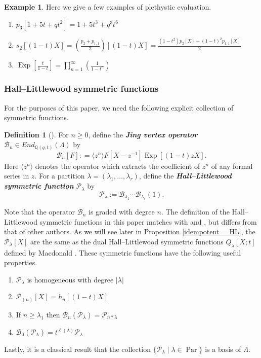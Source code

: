\documentclass[11pt]{article}
\theoremstyle{definition}
\newtheorem{defi}[theo]{Definition}
\newtheorem{exam}[theo]{Example}
\numberwithin{equation}{section}
\DeclareMathOperator{\EXP}{\mathrm{Exp}}
\DeclareMathOperator{\Par}{\mathrm{Par}}
\begin{document}
\begin{exam}
Here we give a few examples of plethystic evaluation.
    \begin{enumerate}
        \item $p_3[1+5t+qt^2] = 1+5t^3 + q^3t^6$
        \item $s_{2}[(1-t)X] = (\frac{p_2+p_{1,1}}{2})[(1-t)X] = \frac{(1-t^2)p_2[X]+(1-t)^2p_{1,1}[X]}{2}$
        \item $\EXP[\frac{t}{1-t}]= \prod_{n=1}^{\infty}(\frac{1}{1-t^n})$
    \end{enumerate}
\end{exam}





\subsubsection{Hall--Littlewood symmetric functions}
For the purposes of this paper, we need the following explicit collection of symmetric functions.
\begin{defi}[\cite{Jing_91}]\label{Jing op defn}
    For $n \geq 0$, define the \textbf{\textit{Jing vertex operator}} $\mathscr{B}_n \in End_{\mathbb{Q}(q,t)}(\Lambda)$ by
    $$\mathscr{B}_n[F] : = \langle z^n \rangle F[X-z^{-1}]\EXP[(1-t)zX].$$
    Here $\langle z^n \rangle $ denotes the operator which extracts the coefficient of $z^n$ of any formal series in $z$. For a partition $\lambda = (\lambda_1,\ldots,\lambda_r)$, define the \textbf{\textit{Hall--Littlewood symmetric function}} $\mathcal{P}_{\lambda}$ by 
    $$\mathcal{P}_{\lambda}:= \mathscr{B}_{\lambda_1}\cdots \mathscr{B}_{\lambda_r}(1).$$
\end{defi}

Note that the operator $\mathscr{B}_n$ is graded with degree $n.$ The definition of the Hall--Littlewood symmetric functions in this paper matches with \cite{Ion_2022} and \cite{CM_2015}, but differs from that of other authors. As we will see later in Proposition \ref{idempotent = HL}, the $\mathcal{P}_{\lambda}[X]$ are the same as the dual Hall--Littlewood symmetric functions $Q_{\lambda}[X;t]$ defined by Macdonald \cite{Macdonald}. These symmetric functions have the following useful properties.
\begin{enumerate}
    \item $\mathcal{P}_{\lambda}$ is homogeneous with degree $|\lambda|$
    \item $\mathcal{P}_{(n)}[X] = h_{n}[(1-t)X]$
    \item If $n \geq \lambda_1$ then $\mathscr{B}_{n}(\mathcal{P}_{\lambda}) = \mathcal{P}_{n*\lambda}$
    \item $\mathscr{B}_{0}(\mathcal{P}_{\lambda}) = t^{\ell(\lambda)} \mathcal{P}_{\lambda}$
\end{enumerate}
Lastly, it is a classical result that the collection $\{\mathcal{P}_\lambda \mid \lambda \in \Par\}$ is a basis of $\Lambda$.
\end{document}
